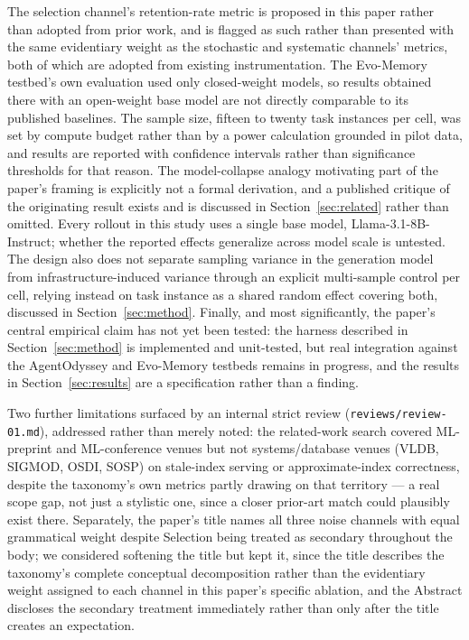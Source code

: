\documentclass{article}
\begin{document}
The selection channel's retention-rate metric is proposed in this paper rather than adopted from prior work, and is flagged as such rather than presented with the same evidentiary weight as the stochastic and systematic channels' metrics, both of which are adopted from existing instrumentation. The Evo-Memory testbed's own evaluation used only closed-weight models, so results obtained there with an open-weight base model are not directly comparable to its published baselines. The sample size, fifteen to twenty task instances per cell, was set by compute budget rather than by a power calculation grounded in pilot data, and results are reported with confidence intervals rather than significance thresholds for that reason. The model-collapse analogy motivating part of the paper's framing is explicitly not a formal derivation, and a published critique of the originating result exists and is discussed in Section~\ref{sec:related} rather than omitted. Every rollout in this study uses a single base model, Llama-3.1-8B-Instruct; whether the reported effects generalize across model scale is untested. The design also does not separate sampling variance in the generation model from infrastructure-induced variance through an explicit multi-sample control per cell, relying instead on task instance as a shared random effect covering both, discussed in Section~\ref{sec:method}. Finally, and most significantly, the paper's central empirical claim has not yet been tested: the harness described in Section~\ref{sec:method} is implemented and unit-tested, but real integration against the AgentOdyssey and Evo-Memory testbeds remains in progress, and the results in Section~\ref{sec:results} are a specification rather than a finding.

Two further limitations surfaced by an internal strict review (\texttt{reviews/review-01.md}), addressed rather than merely noted: the related-work search covered ML-preprint and ML-conference venues but not systems/database venues (VLDB, SIGMOD, OSDI, SOSP) on stale-index serving or approximate-index correctness, despite the taxonomy's own metrics partly drawing on that territory --- a real scope gap, not just a stylistic one, since a closer prior-art match could plausibly exist there. Separately, the paper's title names all three noise channels with equal grammatical weight despite Selection being treated as secondary throughout the body; we considered softening the title but kept it, since the title describes the taxonomy's complete conceptual decomposition rather than the evidentiary weight assigned to each channel in this paper's specific ablation, and the Abstract discloses the secondary treatment immediately rather than only after the title creates an expectation.
\end{document}
